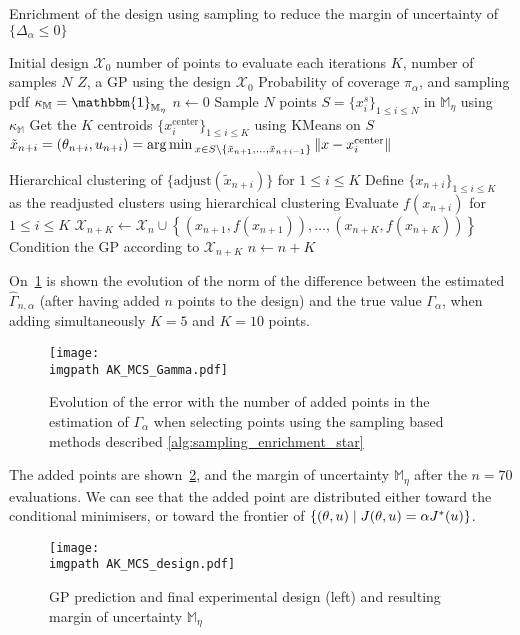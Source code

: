 \documentclass[../../Main_ManuscritThese.tex]{subfiles}
\newcommand\imgpath{/home/victor/acadwriting/Manuscrit/Text/Chapter4/img/}
\begin{document}
\begin{algorithm}
  \caption{Enrichment of the design using sampling to reduce the margin of uncertainty of $\{\Delta_{\alpha}\leq 0\}$}
  \label{alg:sampling_enrichment_star}
\begin{algorithmic}
  \REQUIRE Initial design $\mathcal{X}_0$
  \REQUIRE number of points to evaluate each iterations $K$, number of samples $N$
  \REQUIRE $Z$, a GP using the design $\mathcal{X}_0$
  \REQUIRE Probability of coverage $\pi_{\alpha}$, and sampling pdf $\kappa_{\mathbb{M}} = \mathbbm{1}_{\mathbb{M}_{\eta}}$
\STATE $n \leftarrow 0$
\STATE Sample $N$ points $S = \{x^s_i\}_{1 \leq i \leq N}$ in $\mathbb{M}_{\eta}$ using $\kappa_{\mathbb{M}}$
\STATE Get the $K$ centroids $\{x_i^{\mathrm{center}}\}_{1 \leq i \leq K}$ using KMeans on $S$
\STATE $\tilde{x}_{n+i}=(\theta_{n+i},u_{n+i})=\operatorname*{arg\,min \,}_{x \in S \setminus \{\tilde{x}_{n+1}, \dots, \tilde{x}_{n+i-1}\}} \|x - x_i^{\mathrm{center}} \|$
\ENDFOR

\STATE Hierarchical clustering of $\{\mathrm{adjust}(\tilde{x}_{n+i})\}$ for $1 \leq i \leq K$
\STATE Define $\{x_{n+i}\}_{1\leq i\leq K}$ as the readjusted clusters using hierarchical clustering
\STATE Evaluate $f(x_{n+i})$ for $1\leq i \leq K$
\STATE $\mathcal{X}_{n+K} \leftarrow \mathcal{X}_n \cup \left\{\left(x_{n+1}, f(x_{n+1})\right),\dots,  \left(x_{n+K}, f(x_{n+K})\right)\right\}$
\STATE Condition the GP according to $\mathcal{X}_{n+K}$
\STATE $n \leftarrow n + K$
\ENDWHILE
\end{algorithmic}
\end{algorithm}
On~\cref{fig:AK_MCS_Gamma} is shown the evolution of the norm of the difference between the estimated $\hat{\Gamma}_{n,\alpha}$ (after having added $n$ points to the design) and the true value $\Gamma_{\alpha}$, when adding simultaneously $K=5$ and $K=10$ points.

\begin{figure}[ht]
  \centering
  \texttt{[image: \\imgpath AK\_MCS\_Gamma.pdf]}
  \caption{\label{fig:AK_MCS_Gamma} Evolution of the error with the number of added points in the estimation of $\Gamma_{\alpha}$ when selecting points using the sampling based methods described \cref{alg:sampling_enrichment_star}}
\end{figure}
The added points are shown~\cref{fig:AK_MCS_design}, and the margin of uncertainty $\mathbb{M}_{\eta}$ after the $n=70$ evaluations. We can see that the added point are distributed either toward the conditional minimisers, or toward the frontier of $\{(\theta, u) \mid J(\theta, u) = \alpha J^*(u)\}$.
\begin{figure}[ht]
  \centering
  \texttt{[image: \\imgpath AK\_MCS\_design.pdf]}
  \caption{\label{fig:AK_MCS_design} GP prediction and final experimental design (left) and resulting margin of uncertainty $\mathbb{M}_{\eta}$}
\end{figure}
\end{document}
